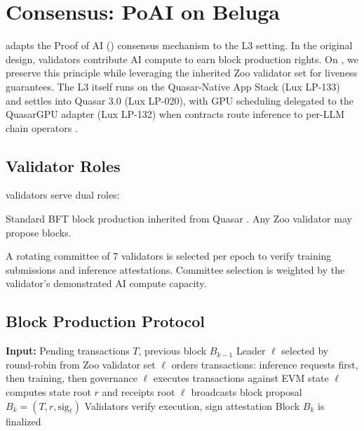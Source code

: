\section{Consensus: PoAI on Beluga}
\label{sec:consensus}

\Beluga{} adapts the Proof of AI (\PoAI{}) consensus mechanism \cite{zoo-poai} to the L3 setting. In the original \PoAI{} design, validators contribute AI compute to earn block production rights. On \Beluga{}, we preserve this principle while leveraging the inherited Zoo validator set for liveness guarantees. The L3 itself runs on the Quasar-Native App Stack (Lux LP-133) and settles into Quasar 3.0 (Lux LP-020), with GPU scheduling delegated to the QuasarGPU adapter (Lux LP-132) when \Beluga{} contracts route inference to per-LLM chain operators \cite{zoo-per-llm-chains}.

\subsection{Validator Roles}

\Beluga{} validators serve dual roles:

\begin{description}[nosep]
    \item[Block production] Standard BFT block production inherited from Quasar \cite{lux-quasar}. Any Zoo validator may propose \Beluga{} blocks.
    \item[AI verification] A rotating committee of 7 validators is selected per epoch to verify training submissions and inference attestations. Committee selection is weighted by the validator's demonstrated AI compute capacity.
\end{description}

\subsection{Block Production Protocol}

\begin{algorithm}
\caption{Beluga block production}
\label{alg:block}
\begin{algorithmic}[1]
\STATE \textbf{Input:} Pending transactions $T$, previous block $B_{k-1}$
\STATE Leader $\ell$ selected by round-robin from Zoo validator set
\STATE $\ell$ orders transactions: inference requests first, then training, then governance
\STATE $\ell$ executes transactions against EVM state
\STATE $\ell$ computes state root $r$ and receipts root
\STATE $\ell$ broadcasts block proposal $B_k = (T, r, \text{sig}_\ell)$
\STATE Validators verify execution, sign attestation
    \STATE Block $B_k$ is finalized
\ENDIF
\end{algorithmic}
\end{algorithm}

